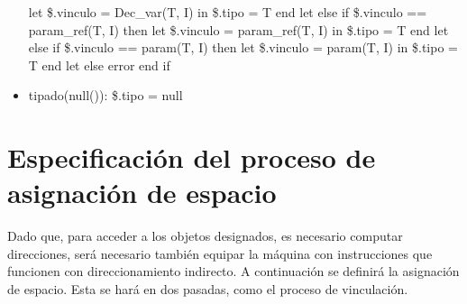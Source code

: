 \documentclass[11pt]{article}
\begin{document}
\begin{itemize}
                    \subsubitem let \$.vinculo = Dec\_var(T, I) in 
                        \subsubitem \hspace{2em} \$.tipo = T
                    \subsubitem end let
                \subitem else if \$.vinculo == param\_ref(T, I) then
                    \subsubitem let \$.vinculo = param\_ref(T, I) in 
                        \subsubitem \hspace{2em} \$.tipo = T
                    \subsubitem end let
                \subitem else if \$.vinculo == param(T, I) then
                    \subsubitem let \$.vinculo = param(T, I) in 
                        \subsubitem \hspace{2em} \$.tipo = T
                    \subsubitem end let
                \subitem else
                    \subsubitem error
                \subitem end if
            \item tipado(null()): 
                \subitem \$.tipo = null
        \end{itemize}


    \section{Especificación del proceso de asignación de espacio}

        Dado que, para acceder a los objetos designados, es necesario computar direcciones, será necesario también equipar la máquina con instrucciones que funcionen con direccionamiento indirecto. A continuación se definirá la asignación de espacio.
        Esta se hará en dos pasadas, como el proceso de vinculación. 
\end{document}
